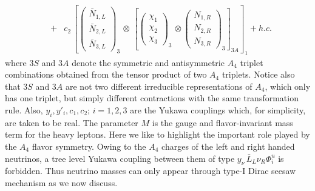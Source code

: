 \documentclass[english,10pt,aps,prd,a4paper,preprintnumbers,floatfix,nofootinbib,showpacs,superscriptaddress]{revtex4-1}
\begin{document}
\begin{eqnarray}
    \nonumber \\
&+&    c_2 \, \left[ \left( \begin{array}{c}  \bar{N}_{1,L}   \\ \bar{N}_{2, L} \\ \bar{N}_{3, L} \end{array} \right)_3  \, \otimes \, \left [  \left( \begin{array}{c}  \chi_{1}   \\ \chi_{2} \\ \chi_{3} \end{array} \right)_3 \, \otimes  \left( \begin{array}{c} N_{1,R}   \\ N_{2,R} \\ N_{3, R} \end{array} \right)_{3}   \right]_{3A} \right ]_1 + h.c.
 \label{neutyuk}
\end{eqnarray}
where $3S$ and $3A$ denote the symmetric and antisymmetric $A_4$
triplet combinations obtained from the tensor product of two $A_4$
triplets. Notice also that $3S$ and $3A$ are not two different
irreducible representations of $A_4$, which only has one triplet, but
simply different contractions with the same transformation rule. Also,
$y_i, y'_i, c_1, c_2$; $i = 1, 2, 3$ are the Yukawa couplings which,
for simplicity, are taken to be real. The parameter $M$ is the gauge
and flavor-invariant mass term for the heavy leptons. Here we like to
highlight the important role played by the $A_4$ flavor
symmetry. Owing to the $A_4$ charges of the left and right handed
neutrinos, a tree level Yukawa coupling between them of type
$y_{\nu} \, \bar L_L \nu_R \Phi^u_i$ is forbidden. Thus neutrino
masses can only appear through type-I Dirac seesaw mechanism as we now
discuss.
 
\end{document}

